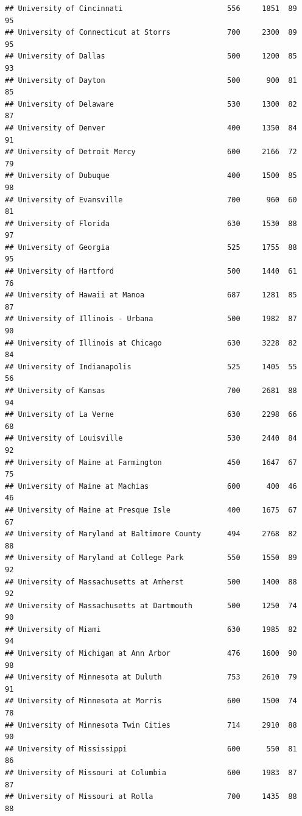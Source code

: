 \documentclass[
]{article}
\begin{document}
\begin{verbatim}
## University of Cincinnati                        556     1851  89       95
## University of Connecticut at Storrs             700     2300  89       95
## University of Dallas                            500     1200  85       93
## University of Dayton                            500      900  81       85
## University of Delaware                          530     1300  82       87
## University of Denver                            400     1350  84       91
## University of Detroit Mercy                     600     2166  72       79
## University of Dubuque                           400     1500  85       98
## University of Evansville                        700      960  60       81
## University of Florida                           630     1530  88       97
## University of Georgia                           525     1755  88       95
## University of Hartford                          500     1440  61       76
## University of Hawaii at Manoa                   687     1281  85       87
## University of Illinois - Urbana                 500     1982  87       90
## University of Illinois at Chicago               630     3228  82       84
## University of Indianapolis                      525     1405  55       56
## University of Kansas                            700     2681  88       94
## University of La Verne                          630     2298  66       68
## University of Louisville                        530     2440  84       92
## University of Maine at Farmington               450     1647  67       75
## University of Maine at Machias                  600      400  46       46
## University of Maine at Presque Isle             400     1675  67       67
## University of Maryland at Baltimore County      494     2768  82       88
## University of Maryland at College Park          550     1550  89       92
## University of Massachusetts at Amherst          500     1400  88       92
## University of Massachusetts at Dartmouth        500     1250  74       90
## University of Miami                             630     1985  82       94
## University of Michigan at Ann Arbor             476     1600  90       98
## University of Minnesota at Duluth               753     2610  79       91
## University of Minnesota at Morris               600     1500  74       78
## University of Minnesota Twin Cities             714     2910  88       90
## University of Mississippi                       600      550  81       86
## University of Missouri at Columbia              600     1983  87       87
## University of Missouri at Rolla                 700     1435  88       88

\end{verbatim}
\end{document}
